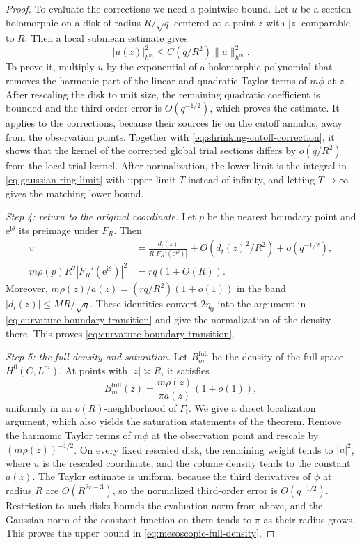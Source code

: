 \begin{proof}
To evaluate the corrections we need a pointwise bound. Let $u$ be a section holomorphic on a disk of radius $R/\sqrt q$ centered at a point $z$ with $|z|$ comparable to $R$. Then a local submean estimate gives
\begin{equation}\label{eq:shrinking-point-evaluation}
 |u(z)|_{h^m}^2\leq C(q/R^2)\|u\|_{h^m}^2.
\end{equation}
To prove it, multiply $u$ by the exponential of a holomorphic polynomial that removes the harmonic part of the linear and quadratic Taylor terms of $m\phi$ at $z$. After rescaling the disk to unit size, the remaining quadratic coefficient is bounded and the third-order error is $O(q^{-1/2})$, which proves the estimate.
It applies to the corrections, because their sources lie on the cutoff annulus, away from the observation points. Together with \eqref{eq:shrinking-cutoff-correction}, it shows that the kernel of the corrected global trial sections differs by $o(q/R^2)$ from the local trial kernel. After normalization, the lower limit is the integral in \eqref{eq:gaussian-ring-limit} with upper limit $T$ instead of infinity, and letting $T\to\infty$ gives the matching lower bound.

\emph{Step 4: return to the original coordinate.}
Let $p$ be the nearest boundary point and $\mathrm{e}^{\mathrm{i}\theta}$ its preimage under $F_R$. Then
\[
 \begin{aligned}
 v&=\frac{d_t(z)}{R|F_R'(\mathrm{e}^{\mathrm{i}\theta})|}
       +O(d_t(z)^2/R^2)+o(q^{-1/2}),\\
 m\rho(p)R^2|F_R'(\mathrm{e}^{\mathrm{i}\theta})|^2&=rq(1+O(R)).
 \end{aligned}
\]
Moreover, $m\rho(z)/a(z)=(rq/R^2)(1+o(1))$ in the band $|d_t(z)|\leq MR/\sqrt q$.
These identities convert $2\eta_0$ into the argument in \eqref{eq:curvature-boundary-transition} and give the normalization of the density there. This proves \eqref{eq:curvature-boundary-transition}.

\emph{Step 5: the full density and saturation.}
Let $B_m^{\mathrm{full}}$ be the density of the full space $H^0(C,L^m)$. At points with $|z|\asymp R$, it satisfies
\begin{equation}\label{eq:mesoscopic-full-density}
 B_m^{\mathrm{full}}(z)=\frac{m\rho(z)}{\pi a(z)}(1+o(1)),
\end{equation}
uniformly in an $o(R)$-neighborhood of $\Gamma_t$. We give a direct localization argument, which also yields the saturation statements of the theorem. Remove the harmonic Taylor terms of $m\phi$ at the observation point and rescale by $(m\rho(z))^{-1/2}$. On every fixed rescaled disk, the remaining weight tends to $|u|^2$, where $u$ is the rescaled coordinate, and the volume density tends to the constant $a(z)$. The Taylor estimate is uniform, because the third derivatives of $\phi$ at radius $R$ are $O(R^{2r-3})$, so the normalized third-order error is $O(q^{-1/2})$. Restriction to such disks bounds the evaluation norm from above, and the Gaussian norm of the constant function on them tends to $\pi$ as their radius grows. This proves the upper bound in \eqref{eq:mesoscopic-full-density}.


\end{proof}
